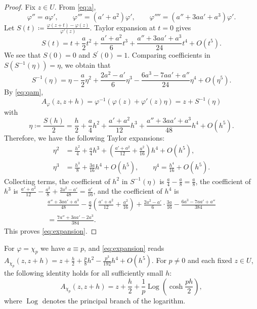 \documentclass[a4paper, reqno, 11pt]{amsart}
\theoremstyle{definition}
\begin{document}
\begin{proof}
Fix $z \in U$.
From \eqref{eq:a},
\begin{equation*}
\varphi'' = a \varphi', \qquad \varphi''' = (a' + a^2) \varphi', \qquad \varphi'''' = (a'' + 3aa' + a^3) \varphi' .
\end{equation*}
Let $S(t) \coloneqq  \frac{\varphi(z+t) - \varphi(z)}{\varphi'(z)}$. 
Taylor expansion at $t = 0$ gives
\begin{equation*}
S(t) = t + \frac{a}{2} t^2 + \frac{a' + a^2}{6} t^3 + \frac{a'' + 3aa' + a^3}{24} t^4 + O(t^5) .
\end{equation*}
We see that $S(0) = 0$ and $S^{\prime}(0) = 1$. 
Comparing coefficients in $S(S^{-1}(\eta)) = \eta$, we obtain that 
\begin{equation*}
S^{-1}(\eta) = \eta - \frac{a}{2}\eta^2 + \frac{2a^2 - a'}{6} \eta^3 - \frac{6a^3 - 7aa' + a''}{24} \eta^4 + O(\eta^5) .
\end{equation*}
By \eqref{eq:qam}, 
\[ A_{\varphi}(z, z+h) = \varphi^{-1}\left( \varphi(z) + \varphi'(z) \eta \right) = z + S^{-1}(\eta)\] 
with
\begin{equation*}
\eta \coloneqq  \frac{S(h)}{2} = \frac{h}{2} + \frac{a}{4} h^2 + \frac{a'+a^2}{12} h^3 + \frac{a'' + 3aa' + a^3}{48} h^4 + O(h^5) .
\end{equation*}
Therefore, we have the following Taylor expansions: 
\begin{align*}
\eta^2 &= \frac{h^2}{4} + \frac{a}{4} h^3 + \left( \frac{a'+a^2}{12} + \frac{a^2}{16} \right) h^4 + O(h^5), \\
\eta^3 &= \frac{h^3}{8} + \frac{3a}{16} h^4 + O(h^5), \qquad
\eta^4 = \frac{h^4}{16} + O(h^5) .
\end{align*}
Collecting terms, the coefficient of $h^2$ in $S^{-1}(\eta)$ is $\frac{a}{4} - \frac{a}{8} = \frac{a}{8}$,
the coefficient of $h^3$ is $\frac{a'+a^2}{12} - \frac{a^2}{8} + \frac{2a^2 - a'}{48} = \frac{a'}{16}$,
and the coefficient of $h^4$ is
\begin{multline*}
\frac{a'' + 3aa' + a^3}{48} - \frac{a}{2}\left( \frac{a'+a^2}{12} + \frac{a^2}{16} \right) + \frac{2a^2 - a'}{6} \cdot \frac{3a}{16} - \frac{6a^3 - 7aa' + a''}{384} \\
= \frac{7a'' + 3aa' - 2a^3}{384} .
\end{multline*}
This proves \eqref{eq:expansion}.
\end{proof}

For $\varphi = \chi_p$ we have $a \equiv p$, and \eqref{eq:expansion} reads $A_{\chi_p}(z,z+h) = z + \frac{h}{2} + \frac{p}{8}h^2 - \frac{p^3}{192} h^4 + O(h^5)$.
For $p\ne0$ and each fixed $z\in U$, the following identity holds for all sufficiently small $h$:
\[ A_{\chi_p}(z,z+h) = z + \frac{h}{2} + \frac{1}{p} \operatorname{Log} \left(\cosh \frac{ph}{2} \right),\]
where $\operatorname{Log}$ denotes the principal branch of the logarithm.
\end{document}
